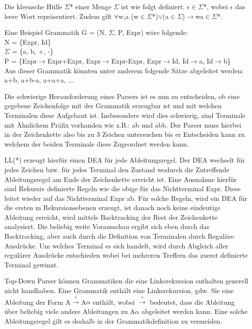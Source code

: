 Die kleensche Hülle $\Sigma$* einer Menge $\Sigma$ ist wie folgt definiert. $\epsilon\in\Sigma$*, wobei $\epsilon$ das leere Wort repräsentiert. Zudem gilt $\forall$w,a (w$\in\Sigma$*)$\vee$(a$\in\Sigma$)$\rightarrow$wa$\in\Sigma$*. \cite{compiler_dragon_book}

Eine Beispiel Grammatik G = (N, $\Sigma$, P, Expr) wäre folgende: \\
N = \{Expr, Id\} \\
$\Sigma$ = \{a, b, +, -\} \\
P = \{Expr$\rightarrow$Expr+Expr, Expr$\rightarrow$Expr-Expr, Expr$\rightarrow$Id, Id$\rightarrow$a, Id$\rightarrow$b\} \\

Aus dieser Grammatik könnten unter anderem folgende Sätze abgeleitet werden: a+b, a+b-a, a+a+a, ...

Die schwierige Herausforderung eines Parsers ist es nun zu entscheiden, ob eine gegebene Zeichenfolge mit der Grammatik erzeugbar ist und mit welchen Terminalen diese Aufgebaut ist. Insbesondere wird dies schwierig, sind Terminale mit Ähnlichem Präfix vorhanden wie z.B.: ab und abb. Der Parser muss hierbei in der Zeichenkette also bis zu 3 Zeichen untersuchen bis er Entscheiden kann zu welchem der beiden Terminale diese Zugeordnet werden kann.

LL(*) erzeugt hierfür einen \ac{DEA} für jede Ableitungsregel. Der \ac{DEA} wechselt für jedes Zeichen bzw. für jedes Terminal den Zustand wodurch die Zutreffende Ableitungsregel am Ende der Zeichenkette erreicht ist. Eine Ausnahme hierfür sind Rekursiv definierte Regeln wie die obige für das Nichtterminal Expr. Diese leitet wieder auf das Nichtterminal Expr ab. Für solche Regeln, wird ein \ac{DEA} für die ersten m Rekursionsebenen erzeugt, ist danach noch keine eindeutige Ableitung erreicht, wird mittels Backtracking der Rest der Zeichenkette analysiert.
Die beliebig weite Vorausschau ergibt sich eben durch das Backtracking, aber auch durch die Definition von Terminalen durch Reguläre Ausdrücke. Um welches Terminal es sich handelt, wird durch Abgleich aller regulärer Ausdrücke entschieden wobei bei mehreren Treffern das zuerst definierte Terminal gewinnt. \cite{ll_star_parser}

Top-Down Parser können Grammatiken die eine Linksrekursion enthalten generell nicht handhaben. \cite{compiler_dragon_book} Eine Grammatik enthält eine Linksrekursion, gdw. Sie eine Ableitung der Form A$\xrightarrow{\text{+}}$A$\alpha$ enthält, wobei $\xrightarrow{\text{+}}$ bedeutet, dass die Ableitung über beliebig viele andere Ableitungen zu A$\alpha$ abgeleitet werden kann.
Eine solche Ableitungsregel gilt es deshalb in der Grammatikdefinition zu vermeiden.

